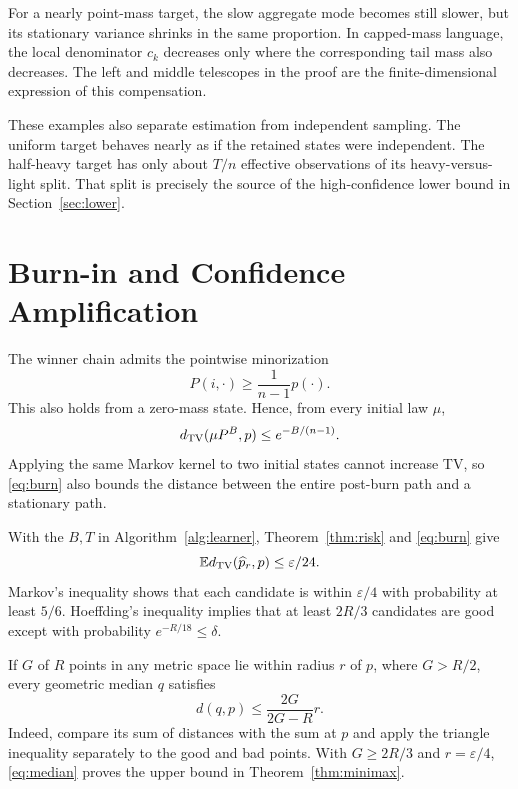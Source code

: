 \documentclass[twoside]{article}
\newcommand{\E}{\mathbb E}
\newcommand{\TV}{d_{\rm TV}}
\begin{document}
For a nearly point-mass target, the slow aggregate mode becomes still slower, but its stationary variance shrinks in the same proportion. In capped-mass language, the local denominator $c_k$ decreases only where the corresponding tail mass also decreases. The left and middle telescopes in the proof are the finite-dimensional expression of this compensation.

These examples also separate estimation from independent sampling. The uniform target behaves nearly as if the retained states were independent. The half-heavy target has only about $T/n$ effective observations of its heavy-versus-light split. That split is precisely the source of the high-confidence lower bound in Section~\ref{sec:lower}.

\section{Burn-in and Confidence Amplification}
\label{sec:upper}

The winner chain admits the pointwise minorization
\begin{equation}
 P(i,\cdot)\ge\frac1{n-1}p(\cdot).
 \label{eq:minorization}
\end{equation}
This also holds from a zero-mass state. Hence, from every initial law $\mu$,
\begin{equation}
 \TV(\mu P^B,p)\le e^{-B/(n-1)}.
 \label{eq:burn}
\end{equation}
Applying the same Markov kernel to two initial states cannot increase TV, so \eqref{eq:burn} also bounds the distance between the entire post-burn path and a stationary path.

With the $B,T$ in Algorithm~\ref{alg:learner}, Theorem~\ref{thm:risk} and \eqref{eq:burn} give \[ \E\TV(\widehat p_r,p)\le\varepsilon/24. \] Markov's inequality shows that each candidate is within $\varepsilon/4$ with probability at least $5/6$. Hoeffding's inequality implies that at least $2R/3$ candidates are good except with probability $e^{-R/18}\le\delta$.

If $G$ of $R$ points in any metric space lie within radius $r$ of $p$, where $G>R/2$, every geometric median $q$ satisfies
\begin{equation}
 d(q,p)\le\frac{2G}{2G-R}r.
 \label{eq:median}
\end{equation}
Indeed, compare its sum of distances with the sum at $p$ and apply the triangle inequality separately to the good and bad points. With $G\ge2R/3$ and $r=\varepsilon/4$, \eqref{eq:median} proves the upper bound in Theorem~\ref{thm:minimax}.
\end{document}
